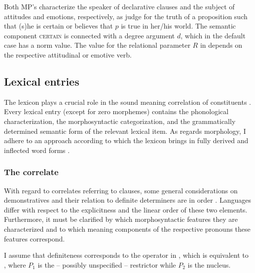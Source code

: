 \documentclass[output=paper]{langscibook}
\begin{document}
\noindent Both MP's characterize the speaker of declarative clauses and the subject of attitudes and emotions, respectively, as judge for the truth of a proposition such that (s)he is certain or believes that $p$ is true in her/his world. The semantic component \textsc{certain} is connected with a degree argument $d$, which in the default case has a norm value. The value for the relational parameter $R$ in  depends on the respective attitudinal or emotive verb.


\subsection{Lexical entries}\label{s:2.3}

The lexicon plays a crucial role in the sound meaning correlation of constituents \citep[see][]{Zimmermann1987,Zimmermann2018b}. Every lexical entry (except for zero morphemes) contains the phonological characterization, the morphosyntactic categorization, and the grammatically determined semantic form of the relevant lexical item. As regards morphology, I adhere to an approach according to which the lexicon brings in fully derived and inflected word forms \citep[see, a.o.,][]{Zimmermann1987,Zimmermann1988,Zimmermann1990,Zimmermann2013,Zimmermann2018b,Wunderlich1997,Pitsch2014a,Pitsch2014b}.


\subsubsection{The correlate}\label{s:2.3.1}

With regard to correlates referring to clauses, some general considerations on demonstratives and their relation to definite determiners are in order \citep[see, a.o.,][]{Fabricius-Hansen1981,Schwabe2013,SchwabeFreyMeinunger2016}. Languages differ with respect to the explicitness and the linear order of these two elements. Furthermore, it must be clarified by which morphosyntactic features they are characterized and to which meaning components of the respective pronouns these features correspond.

I assume that definiteness corresponds to the operator in , which is equi\-valent to  , where $P_1$ is the -- possibly unspecified -- restrictor while $P_2$ is the nucleus.
\end{document}
